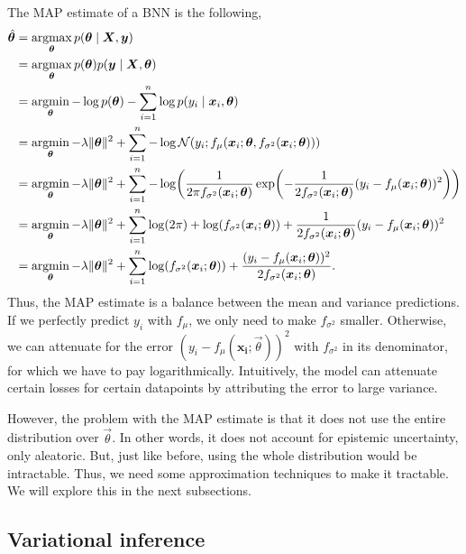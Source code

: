 The MAP estimate of a BNN is the following,
\begin{align*}
  \hat{\vec{\theta}} &= \argmax_{\vec{\theta}} p(\vec{\theta}\mid\mat{X},\vec{y}) \\
  &= \argmax_{\vec{\theta}} p(\vec{\theta}) p(\vec{y}\mid\mat{X},\vec{\theta}) \\
  &= \argmin_{\vec{\theta}} -\log p(\vec{\theta}) - \sum_{i=1}^n \log p(y_i\mid\vec{x}_i,\vec{\theta}) \\
  &= \argmin_{\vec{\theta}} -\lambda\lVert \vec{\theta} \rVert^2 + \sum_{i=1}^n -\log \mathcal{N}(y_i; f_\mu(\vec{x}_i;\vec{\theta}, f_{\sigma^2}(\vec{x}_i;\vec{\theta}))) \\
  &= \argmin_{\vec{\theta}} -\lambda\lVert \vec{\theta} \rVert^2 + \sum_{i=1}^n -\log \lft( \frac{1}{2\pi f_{\sigma^2}(\vec{x}_i;\vec{\theta})} \exp\lft( -\frac{1}{2f_{\sigma^2}(\vec{x}_i;\vec{\theta})} (y_i - f_\mu(\vec{x}_i;\vec{\theta}))^2 \rgt) \rgt) \\
  &= \argmin_{\vec{\theta}} -\lambda\lVert \vec{\theta} \rVert^2 + \sum_{i=1}^n \log(2\pi) + \log(f_{\sigma^2}(\vec{x}_i;\vec{\theta})) + \frac{1}{2f_{\sigma^2}(\vec{x}_i;\vec{\theta})} (y_i - f_\mu(\vec{x}_i;\vec{\theta}))^2 \\
  &= \argmin_{\vec{\theta}} -\lambda\lVert \vec{\theta} \rVert^2 + \sum_{i=1}^n \log(f_{\sigma^2}(\vec{x}_i;\vec{\theta})) + \frac{(y_i - f_\mu(\vec{x}_i;\vec{\theta}))^2}{2f_{\sigma^2}(\vec{x}_i;\vec{\theta})}
.\end{align*}
Thus, the MAP estimate is a balance between the mean and variance
predictions. If we perfectly predict $y_i$ with $f_\mu$, we only need to make
$f_{\sigma^2}$ smaller. Otherwise, we can attenuate for the error
$(y_i-f_\mu(\bm{x_i};\vec{\theta}))^2$ with $f_{\sigma^2}$ in its denominator,
for which we have to pay logarithmically. Intuitively, the model can attenuate
  certain losses for certain datapoints by attributing the error to large
  variance.

However, the problem with the MAP estimate is that it does not use the entire
distribution over $\vec{\theta}$. In other words, it does not account for
epistemic uncertainty, only aleatoric. But, just like before, using the whole
distribution would be intractable. Thus, we need some approximation techniques
to make it tractable. We will explore this in the next subsections.

\subsection{Variational inference}


